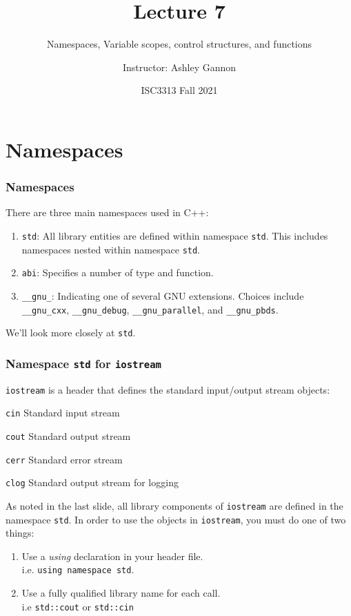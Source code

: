 \documentclass{if-beamer}
\title[Lecture 7]{Lecture 7 }
\subtitle{Namespaces, Variable scopes, control structures, and functions}
\author{Instructor: Ashley Gannon}
\date{ISC3313 Fall 2021}
\begin{document}
\begin{frame}
  \titlepage
\end{frame}
\section{Namespaces}

\begin{frame}
\frametitle{Namespaces}
There are three main namespaces used in C++:
\begin{enumerate}
	\item \texttt{std}: All library entities are defined within namespace \texttt{std}. This includes namespaces nested within namespace \texttt{std}.
	\item \texttt{abi}: Specifies a number of type and function.
	\item \texttt{\_\_gnu\_}: Indicating one of several GNU extensions. Choices include \texttt{\_\_gnu\_cxx}, \texttt{\_\_gnu\_debug}, \texttt{\_\_gnu\_parallel}, and \texttt{\_\_gnu\_pbds}. 
\end{enumerate}
\vspace{5pt}
We'll look more closely at \texttt{std}.
\end{frame}

\begin{frame}
\frametitle{Namespace \texttt{std} for \texttt{iostream}}
\texttt{iostream} is a header that defines the standard input/output stream objects:
\begin{block}{\texttt{cin}}
	Standard input stream
\end{block}
\begin{block}{\texttt{cout}}
	Standard output stream
\end{block}
\begin{block}{\texttt{cerr}}
	Standard error stream
\end{block}
\begin{block}{\texttt{clog}}
	Standard output stream for logging
\end{block}
\vspace{3pt}
As noted in the last slide, all library components of \texttt{iostream} are defined in the namespace \texttt{std}. In order to use the objects in \texttt{iostream}, you must do one of two things:
\begin{enumerate}
	\item Use a \textit{using} declaration in your header file. \\ i.e. \texttt{using namespace std}.
	\item Use a fully qualified library name for each call. \\ i.e \texttt{std::cout} or \texttt{std::cin}
\end{enumerate}
\end{frame}
\end{document}

